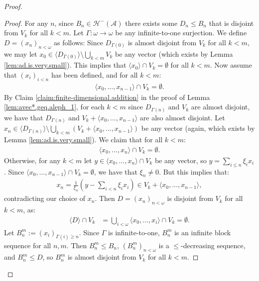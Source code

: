 \documentclass[10pt,a4paper]{amsart}
\theoremstyle{plain}
\numberwithin{equation}{section}
\theoremstyle{definition}
\renewcommand{\c}[1]{\langle #1 \rangle}
\newcommand{\bb}[1]{\left( #1 \right)}
\newcommand{\cal}{\mathcal}
\newcommand{\A}{\cal{A}}
\renewcommand{\H}{\cal{H}}
\newenvironment{midproof}[1][Proof]
  {\begin{proof}[#1]\renewcommand{\qedsymbol}{$\blacksquare$}}
  {\end{proof}}
\begin{document}
\begin{proof}
    \begin{midproof}
        For any $n$, since $B_n \in \H^-(\A)$ there exists some $D_n \leq B_n$ that is disjoint from $V_k$ for all $k < m$. Let $\Gamma : \omega \to \omega$ be any infinite-to-one surjection. We define $D = (x_n)_{n<\omega}$ as follows: Since $D_{\Gamma(0)}$ is almost disjoint from $V_k$ for all $k < m$, we may let $x_0 \in \c{D_{\Gamma(0)}} \setminus \bigcup_{k<m} V_k$ be any vector (which exists by Lemma \ref{lem:ad.is.very.small}). This implies that $\c{x_0} \cap V_k = \emptyset$ for all $k < m$. Now assume that $(x_i)_{i<n}$ has been defined, and for all $k < m$:
        \begin{align*}
            \c{x_0,\dots,x_{n-1}} \cap V_k = \emptyset.
        \end{align*}
        By Claim \ref{claim:finite-dimensional.addition} in the proof of Lemma \ref{lem:avec*.geq.aleph_1}, for each $k < m$ since $D_{\Gamma(n)}$ and $V_k$ are almost disjoint, we have that $D_{\Gamma(n)}$ and $V_k + \c{x_0,\dots,x_{n-1}}$ are also almost disjoint. Let $x_n \in \c{D_{\Gamma(n)}} \setminus \bigcup_{k<m} (V_k + \c{x_0,\dots,x_{n-1}})$ be any vector (again, which exists by Lemma \ref{lem:ad.is.very.small}). We claim that for all $k < m$:
        \begin{align*}
            \c{x_0,\dots,x_n} \cap V_k = \emptyset.
        \end{align*}
        Otherwise, for any $k < m$ let $y \in \c{x_0,\dots,x_n} \cap V_k$ be any vector, so $y = \sum_{i \leq n} \xi_i x_i$. Since $\c{x_0,\dots,x_{n-1}} \cap V_k = \emptyset$, we have that $\xi_n \neq 0$. But this implies that:
        \begin{align*}
            x_n = \frac{1}{\xi_n}\bb{y - \sum_{i<n} \xi_ix_i} \in V_k + \c{x_0,\dots,x_{n-1}},
        \end{align*}
        contradicting our choice of $x_n$. Then $D = (x_n)_{n<\omega}$ is disjoint from $V_k$ for all $k < m$, as:
        \begin{align*}
            \c{D} \cap V_k &= \bigcup_{i<\omega} \c{x_0,\dots,x_i} \cap V_k = \emptyset.
        \end{align*}
        Let $B_n^m := (x_i)_{\Gamma(i) \geq n}$. Since $\Gamma$ is infinite-to-one, $B_n^m$ is an infinite block sequence for all $n,m$. Then $B_n^m \leq B_n$, $(B_n^m)_{n<\omega}$ is a $\leq$-decreasing sequence, and $B_n^m \leq D$, so $B_n^m$ is almost disjoint from $V_k$ for all $k < m$. 
    \end{midproof}
    

\end{proof}
\end{document}
